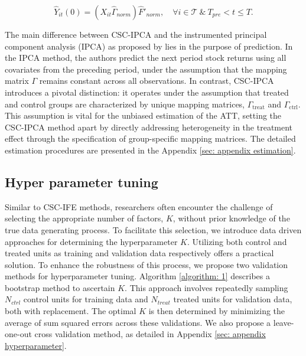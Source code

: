 \documentclass[12pt]{article}
\begin{document}
\begin{equation}
\hat{Y}_{it}(0) = (X_{it} \hat{\Gamma}_{norm}) \hat{F}'_{norm}, \quad \forall i \in \mathcal{T} \ \& \ T_{pre} < t \leq T.
\end{equation}

The main difference between CSC-IPCA and the instrumented principal component analysis (IPCA) as proposed by \cite{kelly2020instrumented} lies in the purpose of prediction. In the IPCA method, the authors predict the next period stock returns using all covariates from the preceding period, under the assumption that the mapping matrix $\Gamma$ remains constant across all observations. In contrast, CSC-IPCA introduces a pivotal distinction: it operates under the assumption that treated and control groups are characterized by unique mapping matrices, $\Gamma_{\text{treat}}$ and $\Gamma_{\text{ctrl}}$. This assumption is vital for the unbiased estimation of the ATT, setting the CSC-IPCA method apart by directly addressing heterogeneity in the treatment effect through the specification of group-specific mapping matrices. The detailed estimation procedures are presented in the Appendix \ref{sec: appendix estimation}.

\subsection{Hyper parameter tuning}
Similar to CSC-IFE methods, researchers often encounter the challenge of selecting the appropriate number of factors, $K$, without prior knowledge of the true data generating process. To facilitate this selection, we introduce data driven approaches for determining the hyperparameter $K$. Utilizing both control and treated units as training and validation data respectively offers a practical solution. To enhance the robustness of this process, we propose two validation methods for hyperparameter tuning. Algorithm \ref{algorithm: 1} describes a bootstrap method to ascertain $K$. This approach involves repeatedly sampling $N_{ctrl}$ control units for training data and $N_{treat}$ treated units for validation data, both with replacement. The optimal $K$ is then determined by minimizing the average of sum squared errors across these validations. We also propose a leave-one-out cross validation method, as detailed in Appendix \ref{sec: appendix hyperparameter}.
\end{document}
